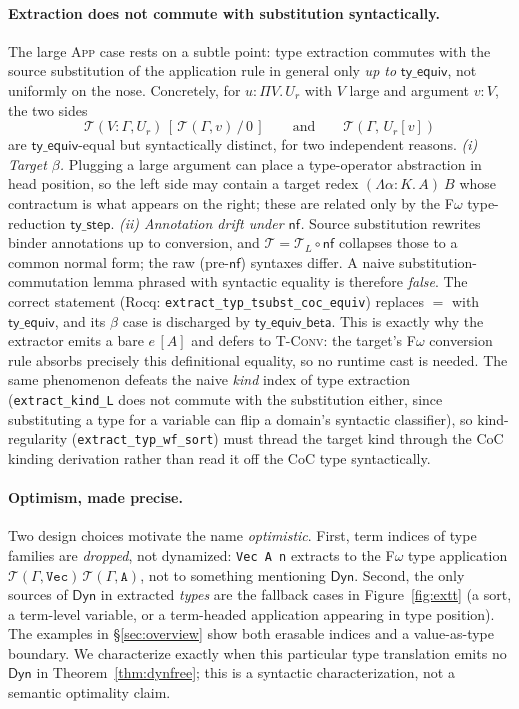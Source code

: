 \documentclass[acmsmall,anonymous=false,nonacm]{acmart}
\newcommand{\dyn}{\ensuremath{\mathsf{Dyn}}}
\newcommand{\extt}{\mathcal{T}}
\newcommand{\nf}{\mathsf{nf}}
\begin{document}
\paragraph{Extraction does not commute with substitution syntactically.}
The large \textsc{App} case rests on a subtle point: type extraction commutes
with the source substitution of the application rule in general only \emph{up
to} $\mathsf{ty\_equiv}$, not uniformly on the nose. Concretely, for
$u : \Pi V.\,U_r$ with
$V$ large and argument $v : V$, the two sides
\[
  \extt(V{:}\Gamma, U_r)\,[\,\extt(\Gamma, v)\,/\,0\,]
  \qquad\text{and}\qquad
  \extt(\Gamma,\, U_r[v])
\]
are $\mathsf{ty\_equiv}$-equal but syntactically distinct, for two independent
reasons. \emph{(i) Target $\beta$.} Plugging a large argument can place a
type-operator abstraction in head position, so the left side may contain a
target redex $(\Lambda \alpha{:}K.\,A)\ B$ whose contractum is what appears on the right;
these are related only by the F$\omega$ type-reduction $\mathsf{ty\_step}$.
\emph{(ii) Annotation drift under $\nf$.} Source substitution rewrites binder
annotations up to conversion, and $\extt = \extt_L \circ \nf$ collapses those to
a common normal form; the raw (pre-$\nf$) syntaxes differ. A naive
substitution-commutation lemma phrased with syntactic equality is therefore
\emph{false}. The correct statement (Rocq: \texttt{extract\_typ\_tsubst\_coc\_equiv})
replaces $=$ with $\mathsf{ty\_equiv}$, and its $\beta$ case is discharged by
$\mathsf{ty\_equiv\_beta}$. This is exactly why the extractor emits a bare $e\,[A]$
and defers to \textsc{T-Conv}: the target's F$\omega$ conversion rule
absorbs precisely this definitional equality, so no runtime cast is needed.
The same phenomenon defeats the naive \emph{kind} index of type extraction
(\texttt{extract\_kind\_L} does not commute with the substitution either, since
substituting a type for a variable can flip a domain's syntactic classifier), so
kind-regularity (\texttt{extract\_typ\_wf\_sort}) must thread the target kind
through the CoC kinding derivation rather than read it off the CoC type
syntactically.

\paragraph{Optimism, made precise.}
Two design choices motivate the name \emph{optimistic}. First, term indices of
type families are \emph{dropped}, not
dynamized: \texttt{Vec A n} extracts to the F$\omega$ type application
$\extt(\Gamma,\texttt{Vec})\,\extt(\Gamma,\texttt{A})$, not to something
mentioning $\dyn$. Second, the only sources of $\dyn$ in extracted \emph{types}
are the fallback cases in Figure~\ref{fig:extt} (a sort, a
term-level variable, or a term-headed application appearing in type position).
The examples in \S\ref{sec:overview} show both erasable indices and a
value-as-type boundary. We characterize exactly when this particular type
translation emits no $\dyn$ in Theorem~\ref{thm:dynfree}; this is a syntactic
characterization, not a semantic optimality claim.
\end{document}
